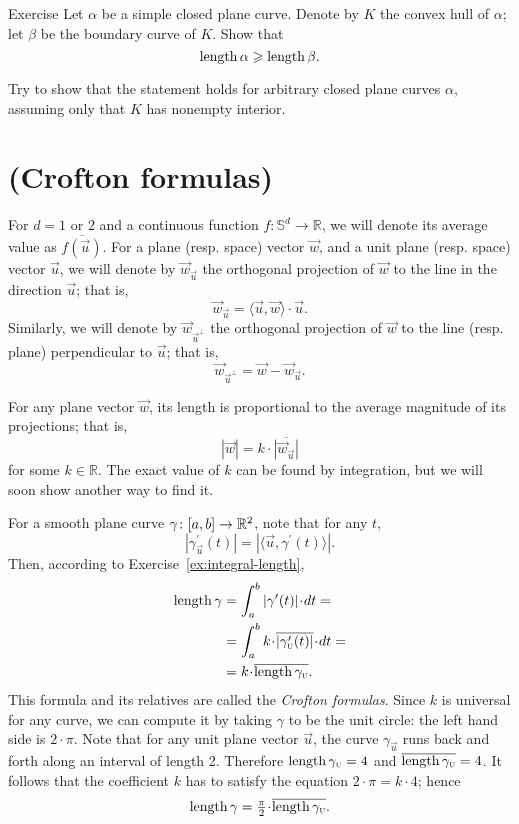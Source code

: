 \begin{thm}{Exercise}\label{ex:convex-hull}
Let $\alpha$ be a simple closed plane curve.
Denote by $K$ the convex hull of $\alpha$; let $\beta$ be the boundary curve of $K$.
Show that 
\[\mathop{\rm length}\nolimits \alpha\geqslant \mathop{\rm length}\nolimits \beta.\]

Try to show that the statement holds for arbitrary closed plane curves $\alpha$, assuming only that $K$ has nonempty interior.
\end{thm}


\section{(Crofton formulas)}\label{sec:crofton}

For $d = 1$ or $2$ and a continuous function $f: \mathbb{S}^d \to \mathbb{R}$, we will denote its average value as $\overline{f( \vec u )}$. For a plane (resp. space) vector $ \vec w $, and a unit plane (resp. space) vector $\vec u $, we will denote by $\vec w _{\vec u }$ the orthogonal projection of $\vec w$ to the line in the direction $\vec u$; that is,
\[   \vec w _{\vec u}  = \langle \vec u , \vec w \rangle \cdot \vec u .   \]
Similarly, we will denote by $\vec w _{  \vec u ^{ \bot } }$ the orthogonal projection of $\vec w$ to the line (resp. plane) perpendicular to $\vec u$; that is,
\[  \vec w _{\vec u ^{\bot }} =  \vec w - \vec w_{\vec u}  .  \] 

For any plane vector ${\vec w}$, its length is proportional to the average magnitude of its projections; that is,
\[|{\vec w}|=k\cdot \overline{|{\vec w}_{\vec u}|}\]
for some $k \in \mathbb{R}$. The exact value of $k$ can be found by integration, but we will soon show another way to find it. %

For a smooth plane curve $\gamma\colon[a,b]\to\mathbb{R}^2$,  note that for any $t$,
\[   | \gamma^{\prime}_{\vec u} (t) |  =  | \langle \vec u , \gamma^{\prime} (t) \rangle |    . \]
 Then, according to Exercise~\ref{ex:integral-length},
\begin{align*}
\length\gamma
&=\int_a^b|\gamma'(t)|\cdot dt=
\\
&=\int_a^b  k\cdot \overline{|\gamma_{\vec u}'(t)|}\cdot dt=
\\
&=k\cdot \overline{\length\gamma_{\vec u}}.
\end{align*}
This formula and its relatives are called the \emph{Crofton formulas}. %
Since $k$ is universal for any curve, we can compute it by taking $\gamma$ to be the unit circle: the left hand side is $2\cdot\pi$.
Note that for any unit plane vector ${\vec u}$, the curve $\gamma_{\vec u}$ runs back and forth along an interval of length 2.
Therefore $\mathop{\rm length}\nolimits\gamma_{\textsc u}=4$ and $\overline{\mathop{\rm length}\nolimits\gamma_{\textsc u}  } =4$.
It follows that the coefficient $k$ has to satisfy the equation $2\cdot \pi =k\cdot 4$; hence 
\[
\length\gamma
=\tfrac\pi2\cdot \overline{\length\gamma_{\vec u}}.
\]

